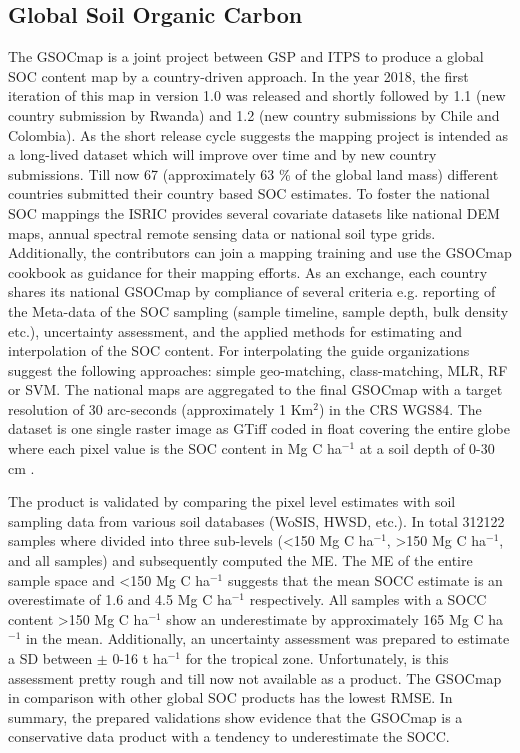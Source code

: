 	\subsection{Global Soil Organic Carbon}
		The \ac{GSOCmap} is a joint project between \ac{GSP} and \ac{ITPS} to produce a global \ac{SOC} content map by a country-driven approach. In the year 2018, the first iteration of this map in version 1.0 was released and shortly followed by 1.1 (new country submission by Rwanda) and 1.2 (new country submissions by Chile and Colombia). As the short release cycle suggests the mapping project is intended as a long-lived dataset which will improve over time and by new country submissions. Till now 67 (approximately 63 \% of the global land mass) different countries submitted their country based \ac{SOC} estimates. To foster the national \ac{SOC} mappings the \ac{ISRIC} provides several covariate datasets like national \ac{DEM} maps, annual spectral remote sensing data or national soil type grids. Additionally, the contributors can join a mapping training and use the \ac{GSOCmap} cookbook as guidance for their mapping efforts. As an exchange, each country shares its national \ac{GSOCmap} by compliance of several criteria e.g. reporting of the Meta-data of the \ac{SOC} sampling (sample timeline, sample depth, bulk density etc.), uncertainty assessment, and the applied methods for estimating and interpolation of the \ac{SOC} content. For interpolating the guide organizations suggest the following approaches: simple geo-matching, class-matching, \ac{MLR}, \ac{RF} or \ac{SVM}. The national maps are aggregated to the final \ac{GSOCmap} with a target resolution of 30 arc-seconds (approximately 1 Km$^2$) in the \ac{CRS} \ac{WGS84}. The dataset is one single raster image as \ac{GTiff} coded in float covering the entire globe where each pixel value is the \ac{SOC} content in Mg C ha$^{-1}$ at a soil depth of 0-30 cm \citep{FAO2018}.

		The product is validated by comparing the pixel level estimates with soil sampling data from various soil databases (WoSIS, HWSD, etc.). In total 312122 samples where divided into three sub-levels (<150 Mg C ha$^{-1}$, >150 Mg C ha$^{-1}$, and all samples) and subsequently computed the \ac{ME}. The \ac{ME} of the entire sample space and <150 Mg C ha$^{-1}$ suggests that the mean \ac{SOCC} estimate is an overestimate of 1.6 and 4.5 Mg C ha$^{-1}$ respectively. All samples with a \ac{SOCC} content >150 Mg C ha$^{-1}$ show an underestimate by approximately 165 Mg C ha$^{-1}$ in the mean. Additionally, an uncertainty assessment was prepared to estimate a \ac{SD} between $\pm$ 0-16 t ha$^{-1}$ for the tropical zone. Unfortunately, is this assessment pretty rough and till now not available as a product. The \ac{GSOCmap} in comparison with other global \ac{SOC} products has the lowest \ac{RMSE}. In summary, the prepared validations show evidence that the \ac{GSOCmap} is a conservative data product with a tendency to underestimate the \ac{SOCC}.

